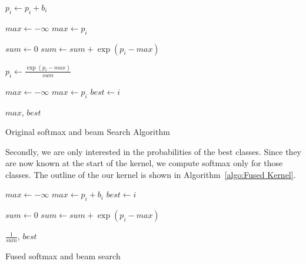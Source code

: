 \documentclass[11pt,a4paper]{article}
\begin{document}
\begin{algorithm}
\begin{algorithmic}
\small

  \State $p_i \gets p_i + b_i$
\EndFor 
\EndProcedure

\State


\State $max \gets - \infty$ 
    \State $max \gets p_i$
  \EndIf
\EndFor

\State $sum \gets 0$ 
  \State $sum \gets sum + \exp(p_i - max)$
\EndFor

  \State $p_i \gets \frac{\exp(p_i - max)}{sum} $
\EndFor 

\EndProcedure

\State


\State $max \gets - \infty$ 
    \State $max \gets p_i$
    \State $best \gets i$
  \EndIf
\EndFor 

\Return $max$, $best$

\EndProcedure

\end{algorithmic}
\caption{Original softmax and beam Search Algorithm}
\label{algo:original-softmax-beamsearch}
\end{algorithm}

Secondly, we are only interested in the probabilities of the best classes. Since they are now known at the start of the kernel, we compute softmax only for those classes. The outline of the our kernel is shown in Algorithm~\ref{algo:Fused Kernel}.

\begin{algorithm}
\begin{algorithmic}
\small



\State $max \gets - \infty$ 
    \State $max \gets p_i + b_i$
    \State $best \gets i$
  \EndIf
\EndFor


\State $sum \gets 0$ 
    \State $sum \gets sum + \exp(p_i - max)$
  \EndIf
\EndFor

\Return $\frac{1}{sum}$, $best$ 

\EndProcedure
\end{algorithmic}

\caption{Fused softmax and beam search}
\label{algo:Fused Kernel}
\end{algorithm}
\end{document}

